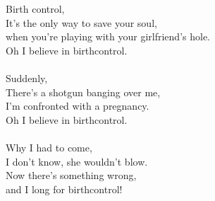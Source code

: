 
            Birth control, \\
            It’s the only way to save your soul, \\
            when you’re playing with your girlfriend’s hole. \\
            Oh I believe in birthcontrol. \\
\hspace{10mm} \\
            Suddenly, \\
            There’s a shotgun banging over me, \\
            I’m confronted with a pregnancy. \\
            Oh I believe in birthcontrol. \\
\hspace{10mm} \\
            Why I had to come, \\
            I don’t know, she wouldn’t blow. \\
            Now there’s something wrong, \\
            and I long for birthcontrol! \\
